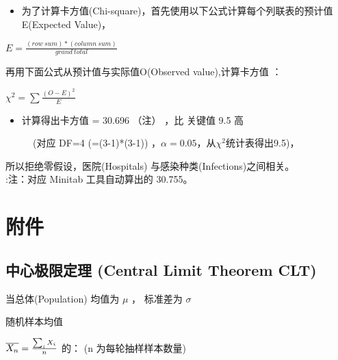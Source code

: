 \begin{itemize}
\tightlist
\item
  为了计算卡方值(Chi-square)，首先使用以下公式计算每个列联表的预计值E(Expected
  Value)，
\end{itemize}

\(E = \frac{(row \ sum) * (column \ sum)} {grand \ total}\)

再用下面公式从预计值与实际值O(Observed value),计算卡方值 ：

\(\chi ^2 = \sum \frac{(O - E)^2} {E}\)

\begin{itemize}
\tightlist
\item
  计算得出卡方值 = 30.696 （注） ，比 关键值 9.5 高
\end{itemize}

\begin{description}
\item[]
(对应 DF=4 (=(3-1)*(3-1))
，\(\alpha = 0.05\)，从\(\chi ^2\)统计表得出9.5)，\\
\end{description}

所以拒绝零假设，医院(Hospitals) 与感染种类(Infections)之间相关。\\
:注：对应 Minitab 工具自动算出的 30.755。

\hypertarget{ux9644ux4ef6}{%
\section{附件}\label{ux9644ux4ef6}}

\hypertarget{ux4e2dux5fc3ux6781ux9650ux5b9aux7406-central-limit-theorem-clt}{%
\subsection{中心极限定理 (Central Limit Theorem
CLT)}\label{ux4e2dux5fc3ux6781ux9650ux5b9aux7406-central-limit-theorem-clt}}

当总体(Population) 均值为 \(\mu\) ， 标准差为 \(\sigma\)

\begin{description}
\tightlist
\item[]
随机样本均值
\end{description}

\(\overline{X_n} = {\sum_i X_i \over n}\) 的： (n 为每轮抽样样本数量)

\begin{description}
\item[]
\end{description}

